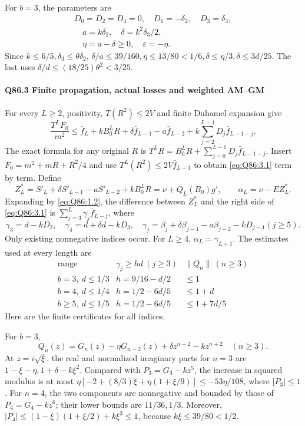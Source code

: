 For \(b=\allowbreak 3\), the parameters are
\[
\begin{gathered}
D_0=D_2=D_4=0,\quad D_1=-\delta_2,\quad D_3=\delta_3,\\
\quad a=k\delta_2,\quad\delta=k^2\delta_3/2,\\
\quad\eta=a-\delta\ge0,\quad\varepsilon=-\eta.
\end{gathered}
\tag{Q86.2.13}\label{eq:Q86:2.13}
\]
Since \(k\le\allowbreak 6/5,\allowbreak \delta_3\le\allowbreak \theta\delta_2\),
\(\delta/a\le\allowbreak 39/160,\allowbreak \eta\le\allowbreak 13/80<\allowbreak 1/6,\allowbreak \delta\le\allowbreak \eta/3,\allowbreak \delta\le\allowbreak 3d/25\).
The last uses \(\delta/d\le\allowbreak (18/25)\theta^2<\allowbreak 3/25\).

\paragraph{Q86.3 Finite propagation, actual losses and weighted AM--GM}
For every \(L\ge\allowbreak 2\), positivity, \(T(R^2)\le\allowbreak 2V\) and finite Duhamel expansion give
\[
\frac{T^LF_0}{m^2}\le
\bar f_L+kB_0^LR+\delta \bar f_{L-1}-a \bar f_{L-2}
+k\sum_{j=2}^{L-1}D_j\bar f_{L-1-j}.
\tag{Q86.3.1}\label{eq:Q86:3.1}
\]
The exact formula for any original \(R\) is
\(T^LR=\allowbreak B_0^LR+\sum_{j=\allowbreak 0}^{L-1}D_j\bar f_{L-1-j}\).
Insert \(F_0=\allowbreak m^2+mR+R^2/4\) and use
\(T^L(R^2)\le\allowbreak 2V\bar f_{L-1}\) to obtain \eqref{eq:Q86:3.1} term by term.
Define
\[
Z_L^*=S'_L+\delta S'_{L-1}-aS'_{L-2}+kB_0^LR
=\nu+Q_L(B_0)g',\qquad \alpha_L=\nu-EZ_L^*.
\]
Expanding by \eqref{eq:Q86:1.2}, the difference between \(Z_L^*\) and the right side of \eqref{eq:Q86:3.1} is
\(\sum_{j=\allowbreak 3}^L\gamma_j\bar f_{L-j}\), where
\[
\gamma_3=d-kD_2,\quad\gamma_4=d+\delta d-kD_3,
\quad
\gamma_j=\beta_j+\delta\beta_{j-1}-a\beta_{j-2}-kD_{j-1} (j\ge5).
\tag{Q86.3.2}\label{eq:Q86:3.2}
\]
Only existing nonnegative indices occur.
For \(L\ge\allowbreak 4\), \(\alpha_L=\allowbreak \gamma_{L+1}\).
The estimates used at every length are
\[
\begin{array}{c|c|c}
\text{range}&\gamma_j\ge hd\ (j\ge3)&\|Q_n\|\ (n\ge3)\\ \hline
b=3,\ d\le1/3&h=9/16-d/2&\le1\\
b=4,\ d\le1/4&h=1/2-6d/5&\le1+d\\
b\ge5,\ d\le1/5&h=1/2-6d/5&\le1+7d/5
\end{array}
\]
Here are the finite certificates for all indices.

For \(b=\allowbreak 3\),
\[
Q_n(z)=G_n(z)-\eta G_{n-2}(z)+\delta z^{n-2}-kz^{n+2}
\quad(n\ge3).
\tag{Q86.3.3}\label{eq:Q86:3.3}
\]
At \(z=\allowbreak i\sqrt\xi\), the real and normalized imaginary parts for \(n=\allowbreak 3\) are
\(1-\xi-\eta,\allowbreak 1+\delta-k\xi^2\).
Compared with \(P_3=\allowbreak G_3-kz^5\), the increase in squared modulus is at most
\(\eta[-2+(8/3)\xi+\eta(1+\xi/9)]\le\allowbreak -53\eta/108\),
where \(|P_3|\le\allowbreak 1\).
For \(n=\allowbreak 4\), the two components are nonnegative and bounded by those of
\(P_4=\allowbreak G_4-kz^6\); their lower bounds are \(11/36,\allowbreak 1/3\).
Moreover,
\(|P_4|\le\allowbreak (1-\xi)(1+\xi/2)+k\xi^3\le\allowbreak 1\), because
\(k\xi\le\allowbreak 39/80<\allowbreak 1/2\).

